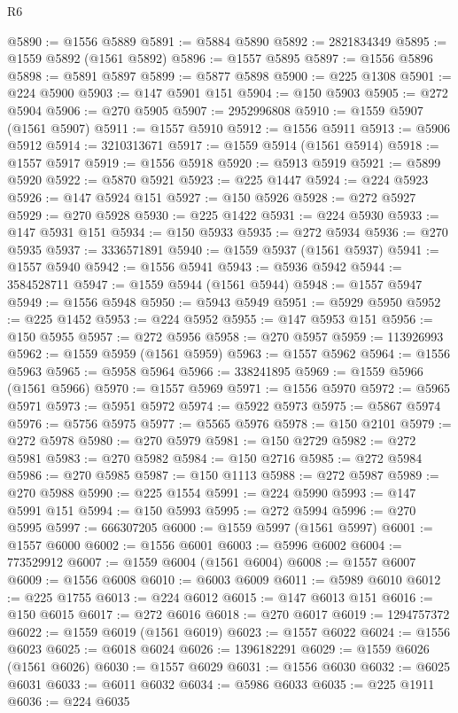 \begin{lexlean}{R6}
\begin{coremodule}
@5890 := @1556 @5889
@5891 := @5884 @5890
@5892 := 2821834349
@5895 := @1559 @5892 (@1561 @5892)
@5896 := @1557 @5895
@5897 := @1556 @5896
@5898 := @5891 @5897
@5899 := @5877 @5898
@5900 := @225 @1308
@5901 := @224 @5900
@5903 := @147 @5901 @151
@5904 := @150 @5903
@5905 := @272 @5904
@5906 := @270 @5905
@5907 := 2952996808
@5910 := @1559 @5907 (@1561 @5907)
@5911 := @1557 @5910
@5912 := @1556 @5911
@5913 := @5906 @5912
@5914 := 3210313671
@5917 := @1559 @5914 (@1561 @5914)
@5918 := @1557 @5917
@5919 := @1556 @5918
@5920 := @5913 @5919
@5921 := @5899 @5920
@5922 := @5870 @5921
@5923 := @225 @1447
@5924 := @224 @5923
@5926 := @147 @5924 @151
@5927 := @150 @5926
@5928 := @272 @5927
@5929 := @270 @5928
@5930 := @225 @1422
@5931 := @224 @5930
@5933 := @147 @5931 @151
@5934 := @150 @5933
@5935 := @272 @5934
@5936 := @270 @5935
@5937 := 3336571891
@5940 := @1559 @5937 (@1561 @5937)
@5941 := @1557 @5940
@5942 := @1556 @5941
@5943 := @5936 @5942
@5944 := 3584528711
@5947 := @1559 @5944 (@1561 @5944)
@5948 := @1557 @5947
@5949 := @1556 @5948
@5950 := @5943 @5949
@5951 := @5929 @5950
@5952 := @225 @1452
@5953 := @224 @5952
@5955 := @147 @5953 @151
@5956 := @150 @5955
@5957 := @272 @5956
@5958 := @270 @5957
@5959 := 113926993
@5962 := @1559 @5959 (@1561 @5959)
@5963 := @1557 @5962
@5964 := @1556 @5963
@5965 := @5958 @5964
@5966 := 338241895
@5969 := @1559 @5966 (@1561 @5966)
@5970 := @1557 @5969
@5971 := @1556 @5970
@5972 := @5965 @5971
@5973 := @5951 @5972
@5974 := @5922 @5973
@5975 := @5867 @5974
@5976 := @5756 @5975
@5977 := @5565 @5976
@5978 := @150 @2101
@5979 := @272 @5978
@5980 := @270 @5979
@5981 := @150 @2729
@5982 := @272 @5981
@5983 := @270 @5982
@5984 := @150 @2716
@5985 := @272 @5984
@5986 := @270 @5985
@5987 := @150 @1113
@5988 := @272 @5987
@5989 := @270 @5988
@5990 := @225 @1554
@5991 := @224 @5990
@5993 := @147 @5991 @151
@5994 := @150 @5993
@5995 := @272 @5994
@5996 := @270 @5995
@5997 := 666307205
@6000 := @1559 @5997 (@1561 @5997)
@6001 := @1557 @6000
@6002 := @1556 @6001
@6003 := @5996 @6002
@6004 := 773529912
@6007 := @1559 @6004 (@1561 @6004)
@6008 := @1557 @6007
@6009 := @1556 @6008
@6010 := @6003 @6009
@6011 := @5989 @6010
@6012 := @225 @1755
@6013 := @224 @6012
@6015 := @147 @6013 @151
@6016 := @150 @6015
@6017 := @272 @6016
@6018 := @270 @6017
@6019 := 1294757372
@6022 := @1559 @6019 (@1561 @6019)
@6023 := @1557 @6022
@6024 := @1556 @6023
@6025 := @6018 @6024
@6026 := 1396182291
@6029 := @1559 @6026 (@1561 @6026)
@6030 := @1557 @6029
@6031 := @1556 @6030
@6032 := @6025 @6031
@6033 := @6011 @6032
@6034 := @5986 @6033
@6035 := @225 @1911
@6036 := @224 @6035

\end{coremodule}
\end{lexlean}
